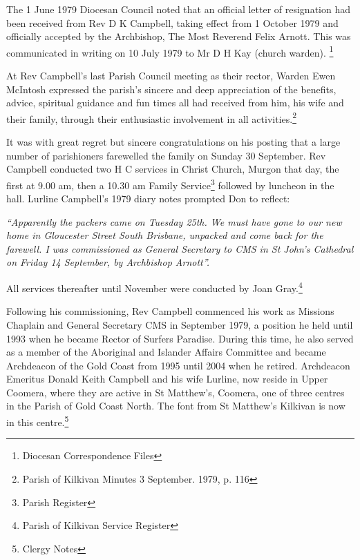 The 1 June 1979 Diocesan Council noted that an official letter of resignation had been received from Rev D K Campbell, taking effect from 1 October 1979 and officially accepted by the Archbishop, The Most Reverend Felix Arnott. This was communicated in writing on 10 July 1979 to Mr D H Kay (church warden). \footnote{Diocesan Correspondence Files}


At Rev Campbell's last Parish Council meeting as their rector, Warden Ewen McIntosh expressed the parish's sincere and deep appreciation of the benefits, advice, spiritual guidance and fun times all had received from him, his wife and their family, through their enthusiastic involvement in all activities.\footnote{Parish of Kilkivan Minutes 3 September. 1979, p. 116}


It was with great regret but sincere congratulations on his posting that a large number of parishioners farewelled the family on Sunday 30 September. Rev Campbell conducted two H C services in Christ Church, Murgon that day, the first at 9.00 am, then a 10.30 am Family Service\footnote{Parish Register} followed by luncheon in the hall. Lurline Campbell's 1979 diary notes prompted Don to reflect:


\emph{``Apparently the packers came on Tuesday 25th. We must have gone to our new home in Gloucester Street South Brisbane, unpacked and come back for the farewell. I was commissioned as General Secretary to CMS in St John's Cathedral on Friday 14 September, by Archbishop Arnott''.}



All services thereafter until November were conducted by Joan Gray.\footnote{Parish of Kilkivan Service Register}


Following his commissioning, Rev Campbell commenced his work as Missions Chaplain and General Secretary CMS in September 1979, a position he held until 1993 when he became Rector of Surfers Paradise. During this time, he also served as a member of the Aboriginal and Islander Affairs Committee and became Archdeacon of the Gold Coast from 1995 until 2004 when he retired. Archdeacon Emeritus Donald Keith Campbell and his wife Lurline, now reside in Upper Coomera, where they are active in St Matthew's, Coomera, one of three centres in the Parish of Gold Coast North. The font from St Matthew's Kilkivan is now in this centre.\footnote{Clergy Notes}


\balance


